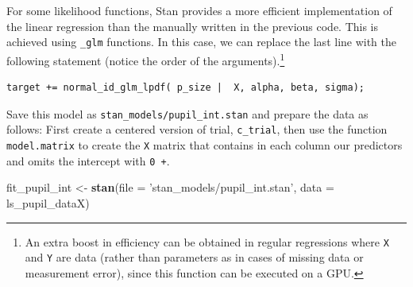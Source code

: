 \documentclass[12pt,]{krantz}
\newenvironment{Shaded}{\begin{snugshade}}{\end{snugshade}}
\newcommand{\DataTypeTok}[1]{\textcolor[rgb]{0.13,0.29,0.53}{#1}}
\newcommand{\DecValTok}[1]{\textcolor[rgb]{0.00,0.00,0.81}{#1}}
\newcommand{\KeywordTok}[1]{\textcolor[rgb]{0.13,0.29,0.53}{\textbf{#1}}}
\newcommand{\NormalTok}[1]{#1}
\newcommand{\OperatorTok}[1]{\textcolor[rgb]{0.81,0.36,0.00}{\textbf{#1}}}
\newcommand{\StringTok}[1]{\textcolor[rgb]{0.31,0.60,0.02}{#1}}
\theoremstyle{definition}
\theoremstyle{definition}
\theoremstyle{definition}
\theoremstyle{remark}
\begin{document}
For some likelihood functions, Stan provides a more efficient implementation of the linear regression than the manually written in the previous code. This is achieved using \texttt{\_glm} functions. In this case, we can replace the last line with the following statement (notice the order of the arguments).\footnote{An extra boost in efficiency can be obtained in regular regressions where \texttt{X} and \texttt{Y} are data (rather than parameters as in cases of missing data or measurement error), since this function can be executed on a GPU.}

\begin{verbatim}
target += normal_id_glm_lpdf( p_size |  X, alpha, beta, sigma);
\end{verbatim}

Save this model as \texttt{stan\_models/pupil\_int.stan} and prepare the data as follows: First create a centered version of trial, \texttt{c\_trial}, then use the function \texttt{model.matrix} to create the \texttt{X} matrix that contains in each column our predictors and omits the intercept with \texttt{0\ +}.

\begin{Shaded}
\end{Shaded}

\begin{Shaded}
\begin{Highlighting}[]
\NormalTok{fit_pupil_int <-}\StringTok{ }\KeywordTok{stan}\NormalTok{(}\DataTypeTok{file =} \StringTok{'stan_models/pupil_int.stan'}\NormalTok{,}
                      \DataTypeTok{data =}\NormalTok{ ls_pupil_dataX)}
\end{Highlighting}
\end{Shaded}
\end{document}
